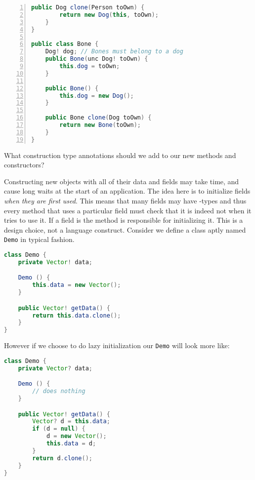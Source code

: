 \documentclass{article}
\begin{document}
\begin{example}
\begin{lstlisting}[language=Java, escapechar=|, numbers=left]
    public Dog clone(Person toOwn) {
        return new Dog(this, toOwn);
    }
}

public class Bone {
    Dog! dog; // Bones must belong to a dog
    public Bone(unc Dog! toOwn) {
        this.dog = toOwn;
    }

    public Bone() {
        this.dog = new Dog();
    }

    public Bone clone(Dog toOwn) {
        return new Bone(toOwn);
    }
}
\end{lstlisting}
  What construction type annotations should we add to our new methods and constructors?
\end{example}

\begin{definition}
  Constructing new objects with all of their data and fields may take time, and cause long waits at the start of an application.
  The idea here is to initialize fields \textit{when they are first used}.
  This means that many fields may have \cringe{}-types and thus every method that uses a particular field must check that it is indeed not \cringe{} when it tries to use it.
  If a field is \cringe{} the method is responsible for initializing it.
  This is a design choice, not a language construct.
  Consider we define a class aptly named \texttt{Demo} in typical fashion.
\begin{lstlisting}[escapechar=|, language=Java]
class Demo {
    private Vector! data;

    Demo () {
        this.data = new Vector();
    }

    public Vector! getData() {
        return this.data.clone();
    }
}
\end{lstlisting}
  However if we choose to do lazy initialization our \texttt{Demo} will look more like:
\begin{lstlisting}[escapechar=|, language=Java]
class Demo {
    private Vector? data;

    Demo () {
        // does nothing
    }

    public Vector! getData() {
        Vector? d = this.data;
        if (d = null) {
            d = new Vector();
            this.data = d;
        }
        return d.clone();
    }
}
\end{lstlisting}
\end{definition}
\end{document}
